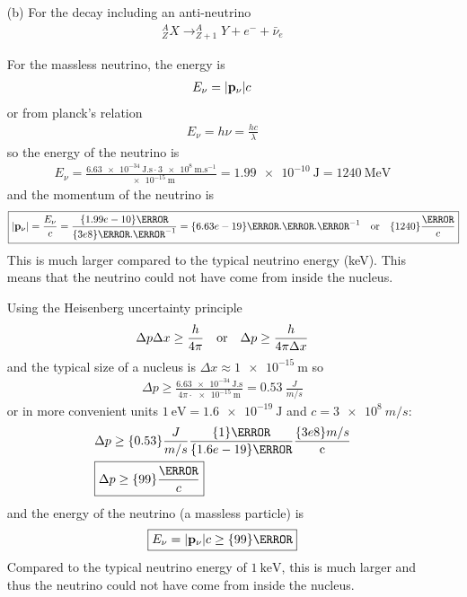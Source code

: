\documentclass[../main.tex]{subfiles}
\begin{document}
\begin{itemize}
\item[(b)] For the decay including an anti-neutrino
\begin{align*}
    _Z^A X \rightarrow _{Z+1}^A Y + e^- + \bar{\nu}_e
\end{align*}

For the massless neutrino, the energy is
\begin{align*}
    E_\nu = \abs{\vb{p}_\nu} c
\end{align*}
or from planck's relation
\begin{align*}
    E_\nu = h \nu = \frac{h c}{\lambda}
\end{align*}
so the energy of the neutrino is
\begin{align*}
    \boxed{
    E_\nu = \frac{\qty{6.63e-34}{\J.\s} \cdot \qty{3e8}{\m.\s^{-1}}}{\qty{e-15}{\m}}
    = \qty{1.99e-10}{\J} = \qty{1240}{\MeV}
    }
\end{align*}
and the momentum of the neutrino is
\begin{align*}
    \boxed{\abs{\vb{p}_\nu} = \frac{E_\nu}{c} = \frac{\qty{1.99e-10}{\J}}{\qty{3e8}{\m.\s^{-1}}}
    = \qty{6.63e-19}{\kg.\m.\s^{-1}} \qor \qty{1240}{\frac{\MeV}{c}}
    }
\end{align*}
This is much larger compared to the typical neutrino energy (keV). This means that the neutrino could
not have come from inside the nucleus.

Using the Heisenberg uncertainty principle
\begin{align*}
    \Delta p \Delta x \geq \frac{h}{4\pi} \qor \Delta p \geq \frac{h}{4\pi \Delta x}
\end{align*}
and the typical size of a nucleus is $\Delta x \approx \qty{1e-15}{\m}$ so
\begin{align*}
    \Delta p \geq \frac{\qty{6.63e-34}{\J.\s}}{4\pi \cdot \qty{e-15}{\m}}
    = \qty{0.53}{\frac{J}{m/s}}
\end{align*}
or in more convenient units $\qty{1}{\eV} = \qty{1.6e-19}{\J}$ and $\unit{c} = \qty{3e8}{m/s}$:
\begin{align*}
    &\Delta p \geq \qty{0.53}{\frac{J}{m/s}} \frac{\qty{1}{\eV}}{\qty{1.6e-19}{\J}}
    \frac{\qty{3e8}{m/s}}{\unit{c}} \\
    &\boxed{
    \Delta p \geq \qty{99}{\frac{\MeV}{c}}
    }
\end{align*}
and the energy of the neutrino (a massless particle) is
\begin{align*}
    \boxed{
    E_\nu = \abs{\vb{p}_\nu} c \geq \qty{99}{\MeV}
    }
\end{align*}
Compared to the typical neutrino energy of $\qty{1}{\keV}$, this is much larger and thus the
neutrino could not have come from inside the nucleus.

\end{itemize} 
\end{document}
